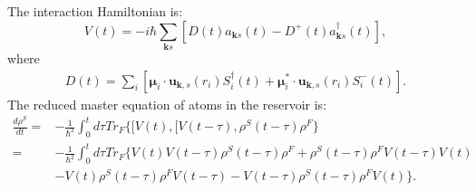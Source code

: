 \documentclass{article}
\let\vec\bm
\begin{document}
The interaction Hamiltonian is:
\begin{equation}
\label{eqa0}\tag{A1}
V(t)=-i\hbar \sum_{\vec{k}s}[D(t)a_{\vec{k}s}(t)-D^{+}(t)a^{\dagger}_{\vec{k}s}(t)],
\end{equation}
where
\begin{equation}
\label{eqa1}\tag{A2}
\begin{gathered}
 D(t)=\underset{i}{\sum}[\vec{\mu}_{i}\cdot\vec{u}_{\vec{k},s}(r_{i})S_{i}^{\dagger}(t)+\vec{\mu}^{*}_{i}\cdot\vec{u}_{\vec{k},s}(r_{i})S_{i}^{-}(t)]. 
 \end{gathered}
\end{equation}
The reduced master equation of atoms in the reservoir is:
\begin{equation}
\label{eqa2}\tag{A3}
\begin{split}
\frac{d\rho^{S}}{dt}=&-\frac{1}{\hbar^{2}}\int_{0}^{t}d\tau Tr_{F}\{[V(t),[V(t-\tau),\rho^{S}(t-\tau)\rho^{F}\}\\
=&-\frac{1}{\hbar^{2}}\int_{0}^{t}d\tau Tr_{F}\{V(t)V(t-\tau)\rho^{S}(t-\tau)\rho^{F}+\rho^{S}(t-\tau)\rho^{F}V(t-\tau)V(t)\\
&-V(t)\rho^{S}(t-\tau)\rho^{F}V(t-\tau)-V(t-\tau)\rho^{S}(t-\tau)\rho^{F}V(t)\}.
\end{split}
\end{equation} 
\end{document}
